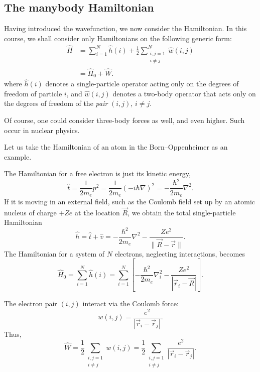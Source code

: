 \documentclass{report}
\theoremstyle{plain}
\theoremstyle{definition}
\begin{document}
  

\subsection{The manybody Hamiltonian}
Having introduced the wavefunction, we now consider the Hamiltonian.
In this course, we shall consider only Hamiltonians on the following
generic form:
\begin{equation}
  \begin{split}
    \hat{H} &= \sum_{i=1}^N \hat{h}(i) + \frac{1}{2}\sum_{\substack{i,j=1\\i\neq j}}^N 
    \hat{w}(i,j) \\ 
    &= \hat{H}_0 + \hat{W}.
  \end{split}
\end{equation}
where $\hat{h}(i)$ denotes a single-particle operator acting only on
the degrees of freedom of particle $i$, and $\hat{w}(i,j)$ denotes a
two-body operator that acts only on the degrees of freedom of the
\emph{pair} $(i,j)$, $i\neq j$.

Of course, one could consider three-body forces as well, and even
higher. Such occur in nuclear physics.

Let us take the Hamiltonian of an atom in the Born--Oppenheimer as an example.

The Hamiltonian for a free electron is just its kinetic energy,
\begin{equation}
  \hat{t} = \frac{1}{2m_e} p^2 = \frac{1}{2m_e}
  (-i\hbar\nabla)^2 = -\frac{\hbar^2}{2m_e}\nabla^2.
\end{equation}
If it is moving in an external field, such as the Coulomb field set up
by an atomic nucleus of charge $+Ze$ at the location $\vec{R}$, we
obtain the total single-particle Hamiltonian
\begin{equation}
  \hat{h} = \hat{t} + \hat{v}  =
  -\frac{\hbar^2}{2m_e}\nabla^2   - \frac{Ze^2}{\|\vec{R}-\vec{r}\|}.
\end{equation}
The Hamiltonian for a system of $N$ electrons, neglecting
interactions, becomes
\begin{equation}
  \hat{H}_0 = \sum_{i=1}^N \hat{h}(i) = \sum_{i=1}^N
  \left[-\frac{\hbar^2}{2m_e} \nabla_i^2 -\frac{Ze^2}{|\vec{r}_i - \vec{R}|}\right].
\end{equation}

The electron pair $(i,j)$ interact via the Coulomb force:
\begin{equation}
  w(i,j) = \frac{e^2}{|\vec{r}_i - \vec{r}_j|}.
\end{equation}
Thus,
\begin{equation}
  \hat{W} = \frac{1}{2}\sum_{\substack{i,j=1\\i\neq j}} w(i,j) =
  \frac{1}{2}\sum_{\substack{i,j=1\\i\neq j}} \frac{e^2}{|\vec{r}_i -
    \vec{r}_j|}.
\end{equation}
\end{document}
